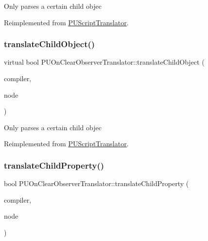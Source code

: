 Only parses a certain child objec 

Reimplemented from \hyperlink{classPUScriptTranslator_ab587d01348ae3e678cb700c719b2b113}{P\+U\+Script\+Translator}.

\mbox{\label{classPUOnClearObserverTranslator_aaf881fa586405a988d625e73eb8f18f0}} 
\subsubsection{\texorpdfstring{translate\+Child\+Object()}{translateChildObject()}\hspace{0.1cm}{\footnotesize\ttfamily [2/2]}}
{\footnotesize\ttfamily virtual bool P\+U\+On\+Clear\+Observer\+Translator\+::translate\+Child\+Object (\begin{DoxyParamCaption}\item[{\hyperlink{classPUScriptCompiler}{P\+U\+Script\+Compiler} $\ast$}]{compiler,  }\item[{\hyperlink{classPUAbstractNode}{P\+U\+Abstract\+Node} $\ast$}]{node }\end{DoxyParamCaption})\hspace{0.3cm}{\ttfamily [virtual]}}

Only parses a certain child objec 

Reimplemented from \hyperlink{classPUScriptTranslator_ab587d01348ae3e678cb700c719b2b113}{P\+U\+Script\+Translator}.

\mbox{\label{classPUOnClearObserverTranslator_ac3952c25c6181ffa759b3cd12f909bb8}} 
\subsubsection{\texorpdfstring{translate\+Child\+Property()}{translateChildProperty()}\hspace{0.1cm}{\footnotesize\ttfamily [1/2]}}
{\footnotesize\ttfamily bool P\+U\+On\+Clear\+Observer\+Translator\+::translate\+Child\+Property (\begin{DoxyParamCaption}\item[{\hyperlink{classPUScriptCompiler}{P\+U\+Script\+Compiler} $\ast$}]{compiler,  }\item[{\hyperlink{classPUAbstractNode}{P\+U\+Abstract\+Node} $\ast$}]{node }\end{DoxyParamCaption})\hspace{0.3cm}{\ttfamily [virtual]}}

